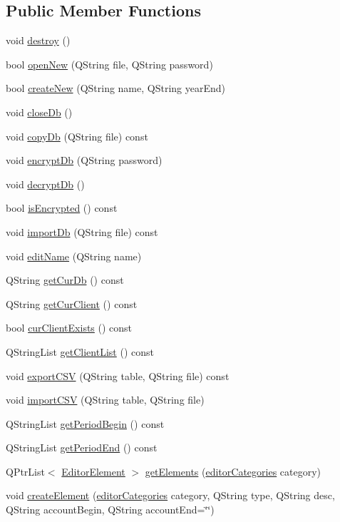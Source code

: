 \subsection*{Public Member Functions}
\begin{CompactItemize}
\item 
void \hyperlink{classDatabase_a0}{destroy} ()
\item 
bool \hyperlink{classDatabase_a1}{open\-New} (QString file, QString password)
\item 
bool \hyperlink{classDatabase_a2}{create\-New} (QString name, QString year\-End)
\item 
void \hyperlink{classDatabase_a3}{close\-Db} ()
\item 
void \hyperlink{classDatabase_a4}{copy\-Db} (QString file) const
\item 
void \hyperlink{classDatabase_a5}{encrypt\-Db} (QString password)
\item 
void \hyperlink{classDatabase_a6}{decrypt\-Db} ()
\item 
bool \hyperlink{classDatabase_a7}{is\-Encrypted} () const
\item 
void \hyperlink{classDatabase_a8}{import\-Db} (QString file) const
\item 
void \hyperlink{classDatabase_a9}{edit\-Name} (QString name)
\item 
QString \hyperlink{classDatabase_a10}{get\-Cur\-Db} () const
\item 
QString \hyperlink{classDatabase_a11}{get\-Cur\-Client} () const
\item 
bool \hyperlink{classDatabase_a12}{cur\-Client\-Exists} () const
\item 
QString\-List \hyperlink{classDatabase_a13}{get\-Client\-List} () const
\item 
void \hyperlink{classDatabase_a14}{export\-CSV} (QString table, QString file) const
\item 
void \hyperlink{classDatabase_a15}{import\-CSV} (QString table, QString file)
\item 
QString\-List \hyperlink{classDatabase_a16}{get\-Period\-Begin} () const
\item 
QString\-List \hyperlink{classDatabase_a17}{get\-Period\-End} () const
\item 
QPtr\-List$<$ \hyperlink{classEditorElement}{Editor\-Element} $>$ \hyperlink{classDatabase_a18}{get\-Elements} (\hyperlink{classDatabase_w8}{editor\-Categories} category)
\item 
void \hyperlink{classDatabase_a19}{create\-Element} (\hyperlink{classDatabase_w8}{editor\-Categories} category, QString type, QString desc, QString account\-Begin, QString account\-End=\char`\"{}\char`\"{})

\end{CompactItemize}

